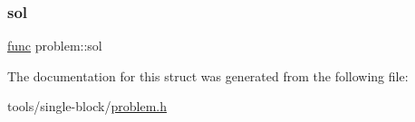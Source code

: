 \mbox{\label{structproblem_a2364d66cb43cac0af9fbfac534b47606}} 
\subsubsection{\texorpdfstring{sol}{sol}}
{\footnotesize\ttfamily \mbox{\hyperlink{base_8h_a6dd92a1df4b8b4a265cd65db9907ebe5}{func}} problem\+::sol}



The documentation for this struct was generated from the following file\+:\begin{DoxyCompactItemize}
\item 
tools/single-\/block/\mbox{\hyperlink{problem_8h}{problem.\+h}}\end{DoxyCompactItemize}
